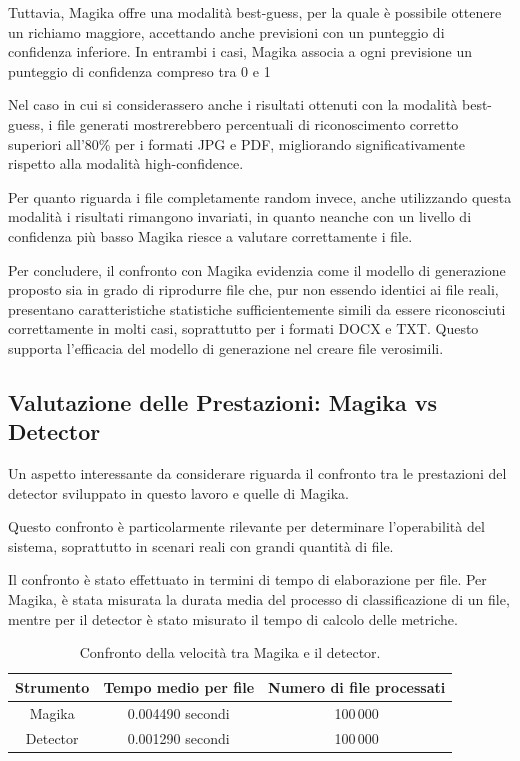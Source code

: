 \documentclass{report}
\begin{document}
\bigskip

Tuttavia, Magika offre una modalità best-guess, per la quale è possibile ottenere un richiamo maggiore,
accettando anche previsioni con un punteggio di confidenza inferiore. In entrambi i casi, Magika associa
a ogni previsione un punteggio di confidenza compreso tra 0 e 1 \cite{google_magika_prediction_modes}

\bigskip

Nel caso in cui si considerassero anche i risultati ottenuti con la modalità best-guess, i file generati
mostrerebbero percentuali di riconoscimento corretto superiori all'80\% per i formati JPG e PDF, migliorando 
significativamente rispetto alla modalità high-confidence.

Per quanto riguarda i file completamente random invece, anche utilizzando questa modalità i risultati 
rimangono invariati, in quanto neanche con un livello di confidenza più basso Magika riesce a 
valutare correttamente i file.

\bigskip

Per concludere, il confronto con Magika evidenzia come il modello di generazione proposto sia in grado di riprodurre 
file che, pur non essendo identici ai file reali, presentano caratteristiche statistiche sufficientemente simili 
da essere riconosciuti correttamente in molti casi, soprattutto per i formati DOCX e TXT. Questo supporta
l'efficacia del modello di generazione nel creare file verosimili.


\subsection{Valutazione delle Prestazioni: Magika vs Detector}

Un aspetto interessante da considerare riguarda il confronto tra le prestazioni
del detector sviluppato in questo lavoro e quelle di Magika.

Questo confronto è particolarmente rilevante per determinare l’operabilità
del sistema, soprattutto in scenari reali con grandi quantità di file.

\bigskip

Il confronto è stato effettuato in termini di tempo di elaborazione per file.
Per Magika, è stata misurata la durata media del processo di classificazione di un
file, mentre per il detector è stato misurato il tempo di calcolo delle metriche.

\bigskip

\begin{table}[htbp]
    \centering
    \begin{tabular}{|c|c|c|}
    \hline
    \textbf{Strumento} & \textbf{Tempo medio per file} & \textbf{Numero di file processati} \\
    \hline
    Magika & 0.004490 secondi & 100\,000 \\
    Detector & 0.001290 secondi & 100\,000 \\
    \hline
    \end{tabular}
    \caption{Confronto della velocità tra Magika e il detector.}
    \label{tab:performance_comparison}
\end{table}
\end{document}
